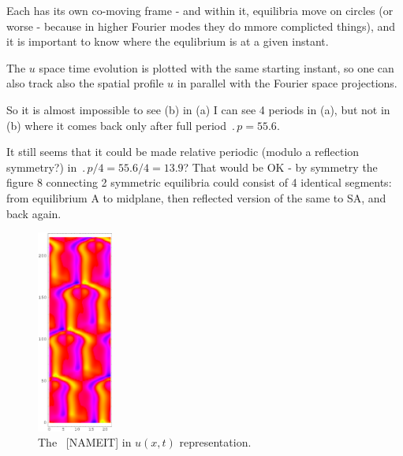 Each {\rpo} has its own co-moving frame - and within it, equilibria
move on circles (or worse - because in higher Fourier modes they do mmore
complicted things), and it is important to know where the equlibrium is at
a given instant.

The $u$ space time evolution  %
is plotted with the same starting instant,
so one can also track also the spatial profile $u$ in parallel with
the Fourier space projections.

So it is almost impossible to see (b) %
in (a) %
I can see 4 periods in (a), %
but not in (b) %
where it comes back only after full period $\period{p}=55.6$.

It still seems that it could be made relative periodic 
(modulo a reflection symmetry?)
in $\period{p}/4=55.6/4=13.9$? That would be OK 
-
by symmetry the figure 8 connecting
2 symmetric equilibria could consist of 4 identical segments: from
equilibrium A to midplane, then reflected version of the same to SA, and
back again.


\begin{figure}[t] %
\centering
 	\includegraphics[width=2.5cm]{figs/rpo22-55-4-u.eps}
\hspace{0.1in}
\caption{
 The \rpo\ [NAMEIT] in $u(x,t)$ representation. 
        }
\label{f:rpoNAMEITu}
\end{figure}


